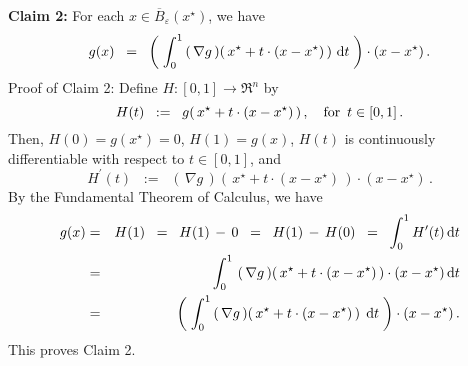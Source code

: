 \begin{enumerate}
	\vskip 0.3cm
	\noindent
	\textbf{Claim 2:}\quad
	For each $x \in \overline{B}_{\varepsilon}(x^{\star})$, we have
	\begin{equation*}
	g(x)
	\;\; = \;\;
		\left(\;
			\int_{0}^{1}
			\left(\,\nabla g\,\right)\!\left(\,x^{\star} + t\cdot(x-x^{\star})\,\right)
			\,\textnormal{d} t
		\;\right)
		\cdot
		(x - x^{\star})\,.
	\end{equation*}	
	Proof of Claim 2:\quad
	Define $H : [0,1] \longrightarrow \Re^{n}$ by
	\begin{equation*}
	H(t) \;\; := \;\; g\!\left(\,x^{\star} + t\cdot(x-x^{\star})\,\right),
	\quad
	\textnormal{for \,$t \in [0,1]$}\,.
	\end{equation*}
	Then, $H(0) = g(x^{\star}) = 0$, $H(1) = g(x)$,
	$H(t)$ is continuously differentiable with respect to $t \in [0,1]$, and
	\begin{equation*}
	H^{\prime}(t) \;\; := \;\; \left(\,\nabla g\,\right)\!\left(\,x^{\star} + t\cdot(x-x^{\star})\,\right) \cdot (x - x^{\star})\,.
	\end{equation*}
	By the Fundamental Theorem of Calculus, we have
	\begin{eqnarray*}
	g(x)
	& = &
		H(1) \;\; = \;\; H(1) \,-\, 0 \;\; = \;\; H(1) \,-\, H(0)
	\;\; = \;\;
		\int_{0}^{1} H^{\prime}(t) \,\textnormal{d} t
	\\
	& = &
		\int_{0}^{1}\,
			\left(\,\nabla g\,\right)\!\left(\,x^{\star} + t\cdot(x-x^{\star})\,\right) \cdot (x - x^{\star})
			\,\textnormal{d} t
	\\
	& = &
		\left(\;\int_{0}^{1}
			\left(\,\nabla g\,\right)\!\left(\,x^{\star} + t\cdot(x-x^{\star})\,\right) 
			\;\textnormal{d} t
			\;\right)
		\cdot (x - x^{\star})\,.
	\end{eqnarray*}
	This proves Claim 2.
	

\end{enumerate}
